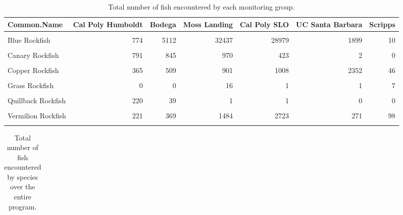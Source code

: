 \documentclass[
]{article}
\begin{document}
\begin{table}

\caption{\label{tab:totalfishbygroup}Total number of fish encountered by each monitoring group.}
\centering
\begin{tabular}[t]{lrrrrrr}
\toprule
Common.Name & Cal Poly Humboldt & Bodega & Moss Landing & Cal Poly SLO & UC Santa Barbara & Scripps\\
\midrule
\cellcolor{gray!6}{Black Rockfish} & \cellcolor{gray!6}{1296} & \cellcolor{gray!6}{1488} & \cellcolor{gray!6}{13272} & \cellcolor{gray!6}{1744} & \cellcolor{gray!6}{2} & \cellcolor{gray!6}{0}\\
Blue Rockfish & 774 & 5112 & 32437 & 28979 & 1899 & 10\\
\cellcolor{gray!6}{Brown Rockfish} & \cellcolor{gray!6}{15} & \cellcolor{gray!6}{749} & \cellcolor{gray!6}{563} & \cellcolor{gray!6}{228} & \cellcolor{gray!6}{25} & \cellcolor{gray!6}{51}\\
Canary Rockfish & 791 & 845 & 970 & 423 & 2 & 0\\
\cellcolor{gray!6}{China Rockfish} & \cellcolor{gray!6}{164} & \cellcolor{gray!6}{495} & \cellcolor{gray!6}{1023} & \cellcolor{gray!6}{112} & \cellcolor{gray!6}{0} & \cellcolor{gray!6}{0}\\
\addlinespace
Copper Rockfish & 365 & 509 & 901 & 1008 & 2352 & 46\\
\cellcolor{gray!6}{Deacon Rockfish} & \cellcolor{gray!6}{1003} & \cellcolor{gray!6}{4895} & \cellcolor{gray!6}{2337} & \cellcolor{gray!6}{343} & \cellcolor{gray!6}{0} & \cellcolor{gray!6}{0}\\
Grass Rockfish & 0 & 0 & 16 & 1 & 1 & 7\\
\cellcolor{gray!6}{Olive Rockfish} & \cellcolor{gray!6}{111} & \cellcolor{gray!6}{701} & \cellcolor{gray!6}{4411} & \cellcolor{gray!6}{4229} & \cellcolor{gray!6}{63} & \cellcolor{gray!6}{74}\\
Quillback Rockfish & 220 & 39 & 1 & 1 & 0 & 0\\
\addlinespace
\cellcolor{gray!6}{Treefish} & \cellcolor{gray!6}{0} & \cellcolor{gray!6}{0} & \cellcolor{gray!6}{35} & \cellcolor{gray!6}{197} & \cellcolor{gray!6}{137} & \cellcolor{gray!6}{139}\\
Vermilion Rockfish & 221 & 369 & 1484 & 2723 & 271 & 98\\
\cellcolor{gray!6}{Yellowtail Rockfish} & \cellcolor{gray!6}{482} & \cellcolor{gray!6}{979} & \cellcolor{gray!6}{1828} & \cellcolor{gray!6}{1029} & \cellcolor{gray!6}{6} & \cellcolor{gray!6}{0}\\
\bottomrule
\end{tabular}
\end{table}

\begin{table}

\caption{\label{tab:totfish}Total number of fish encountered by species over the entire program.}
\centering
\begin{tabular}[t]{r}
\toprule
\cellcolor{gray!6}{YEAR}\\


\bottomrule
\end{tabular}
\end{table}

\FloatBarrier

\clearpage
\newpage
\end{document}
